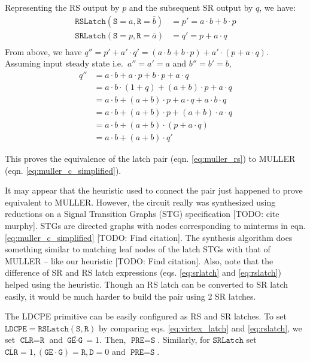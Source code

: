 Representing the RS output by $p$ and the subsequent SR output by $q$,
we have:
\begin{equation}\label{eq:muller_rs}
\begin{split}
	\texttt{RSLatch}(\texttt{S}=a, \texttt{R}=\overline{b}) &= p' = a \cdot b + b \cdot p \\
	\texttt{SRLatch}(\texttt{S}=p, \texttt{R}=\overline{a}) &= q' = p + a \cdot q \\
\end{split}
\end{equation}
From above, we have $q'' = p' + a' \cdot q' = (a \cdot b + b \cdot p) + 
a' \cdot (p + a \cdot q)$. 
Assuming input steady state i.e.\ $a'' = a' = a$ and $b'' = b' = b$,
\begin{equation}
\begin{split}
	q''& = a \cdot b + a \cdot p + b \cdot p + a \cdot q\\
	&= a \cdot b \cdot (1 + q) + (a + b ) \cdot p + a \cdot q\\
	&= a \cdot b + (a + b ) \cdot p + a \cdot q + a \cdot b \cdot q\\
	&= a \cdot b + (a + b ) \cdot p + (a + b) \cdot a \cdot q\\
	&= a \cdot b + (a + b ) \cdot (p + a \cdot q)\\
	&= a \cdot b + (a + b ) \cdot q'
\end{split}
\end{equation}

This proves the equivalence of the latch pair (eqn. \ref{eq:muller_rs}) to MULLER
(eqn. \ref{eq:muller_c_simplified}).

It may appear that the heuristic used to connect the pair just happened to
prove equivalent to MULLER. 
However, the circuit really was synthesized using reductions on a 
Signal Transition Graphs (STG) specification [TODO: cite murphy]. 
STGs are directed graphs with nodes corresponding to minterms in eqn.
\ref{eq:muller_c_simplified} [TODO: Find citation]. 
The synthesis algorithm does something similar to matching leaf nodes of the
latch STGs with that of MULLER -- like our heuristic [TODO: Find
citation]. 
Also, note that the difference of SR and RS latch expressions (eqs.
\ref{eq:srlatch} and \ref{eq:rslatch}) helped using the heuristic. 
Though an RS latch can be converted to SR latch easily, it would be much harder
to build the pair using 2 SR latches.

The LDCPE primitive can be easily configured as RS and SR latches. 
To set $\texttt{LDCPE} = \texttt{RSLatch}(\texttt{S}, \texttt{R})$ by comparing
eqs. \ref{eq:virtex_latch} and \ref{eq:rslatch}, we set
$\texttt{CLR} = \texttt{R}$ and $\overline{\texttt{GE} \cdot \texttt{G}} = 1$.
Then, $\texttt{PRE} = \texttt{S}$.
Similarly, for $\texttt{SRLatch}$ set $\overline{\texttt{CLR}} = 1,
 (\texttt{GE} \cdot \texttt{G}) = \texttt{R}, \texttt{D} = 0$ and $\texttt{PRE}
 = \texttt{S}$.
